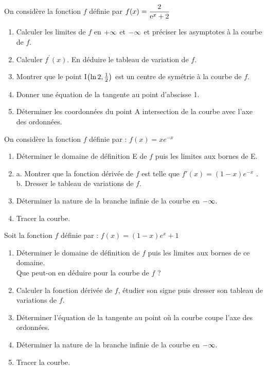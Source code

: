  \begin{exercice}
 On considère la fonction $ f $ définie par $ f(x)=\dfrac{2}{\mathrm{e}^{x}+2} $
 \begin{enumerate}
 \item Calculer  les limites de $ f $  en $+\infty $ et $ -\infty$  et  préciser les asymptotes à la courbe de $ f. $
 \item Calculer $ f^{\prime} (x)$.\; En  déduire le tableau de variation de $ f. $
 \item Montrer que le point I$\left(\ln 2,\frac{1}{2}\right)$ est un centre de symétrie à la courbe de $ f. $
 \item Donner une équation de la tangente au point d'abscisse 1.
 \item Déterminer les coordonnées du point A intersection de la courbe avec l'axe des ordonnées.
 \end{enumerate}
  \end{exercice}
\begin{exercice}
 On considère  la fonction $ f $  définie par : $ f(x)= xe^{-x} $
   \begin{enumerate}
   \item Déterminer le domaine de définition  E  de $ f $  puis les limites  aux bornes  de E.
   \item a. Montrer que   la fonction dérivée de $ f $ est telle que $ f'(x)=(1-x)e^{-x} $ .\\b. Dresser le tableau de variations de $ f $.
   
   \item  Déterminer la nature de la branche infinie de la courbe en $ -\infty. $
   \item Tracer la courbe.
   \end{enumerate}
\end{exercice}

\begin{exercice}
Soit  la fonction $ f $  définie par : $ f(x)= (1-x)e^{x}+1 $
   \begin{enumerate}
   \item Déterminer le domaine de définition de $ f $  puis les limites  aux bornes  de ce domaine.\\
   Que peut-on en déduire pour la courbe de $ f $ ?
   \item Calculer  la fonction dérivée de $ f $, étudier son signe puis dresser son tableau de variations de $ f $.
   \item Déterminer  l'équation de la tangente au point où la courbe coupe l'axe des ordonnées.
   \item  Déterminer la nature de la branche infinie de la courbe en $ -\infty. $
   \item Tracer la courbe.
   \end{enumerate}
\end{exercice}


